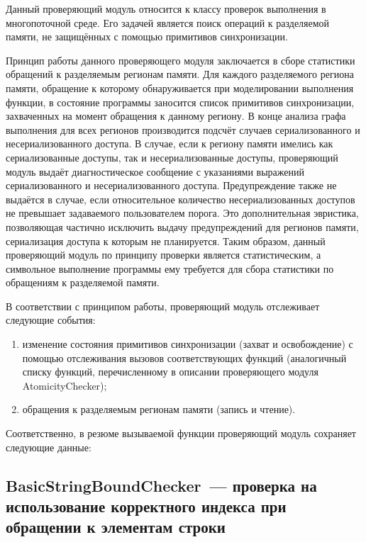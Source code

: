 Данный проверяющий модуль относится к классу проверок выполнения в многопоточной среде. Его задачей является поиск операций  к разделяемой памяти, не защищённых с помощью примитивов синхронизации. 

Принцип работы данного проверяющего модуля заключается в сборе статистики обращений к разделяемым регионам памяти. Для каждого разделяемого региона памяти, обращение к которому обнаруживается при моделировании выполнения функции, в состояние программы заносится список примитивов синхронизации, захваченных на момент обращения к данному региону. В конце анализа графа выполнения для всех регионов производится подсчёт случаев сериализованного и несериализованного доступа. В случае, если к региону памяти имелись как сериализованные доступы, так и несериализованные доступы, проверяющий модуль выдаёт диагностическое сообщение с указаниями выражений сериализованного и несериализованного доступа. Предупреждение также не выдаётся в случае, если относительное количество несериализованных доступов не превышает задаваемого пользователем порога. Это дополнительная эвристика, позволяющая частично исключить выдачу предупреждений для регионов памяти, сериализация доступа к которым не планируется. Таким образом, данный проверяющий модуль по принципу проверки является статистическим, а символьное выполнение программы ему требуется для сбора статистики по обращениям к разделяемой памяти.

В соответствии с принципом работы, проверяющий модуль отслеживает следующие события:

\begin{enumerate}
 \item изменение состояния примитивов синхронизации (захват и освобождение) с помощью отслеживания вызовов соответствующих функций (аналогичный списку функций, перечисленному в описании проверяющего модуля AtomicityChecker);
 \item обращения к разделяемым регионам памяти (запись и чтение).
\end{enumerate}

Соответственно, в резюме вызываемой функции проверяющий модуль сохраняет следующие данные:


\subsection{BasicStringBoundChecker~--- проверка на использование корректного индекса при обращении к элементам строки}

